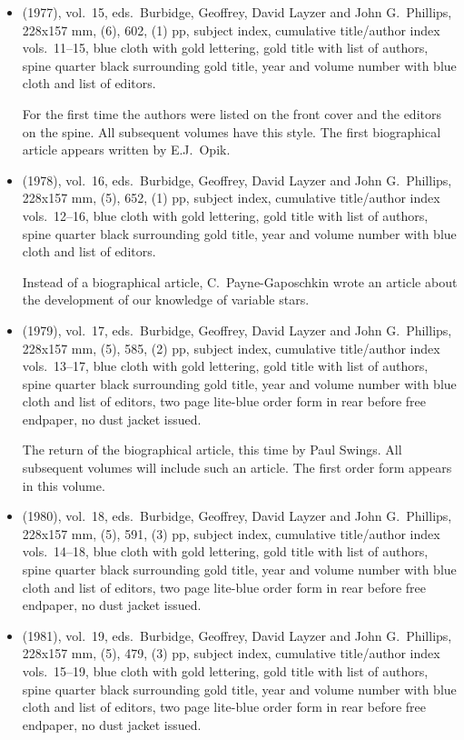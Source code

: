 \begin{itemize}
	\item (1977), vol.\ 15, eds.\ Burbidge, Geoffrey, David Layzer and John G.\ Phillips, 228x157 mm,
	(6), 602, (1) pp, subject index, cumulative title/author index vols.\ 11--15,
	blue cloth with gold lettering, gold title with list of authors,
  spine quarter black surrounding gold title, year and volume number with blue cloth and list of
  editors.
  
  For the first time the authors were listed on the front cover and the editors on the spine.
  All subsequent volumes have this style.  The first biographical article appears written by
  E.J.\ Opik.
	
	\item (1978), vol.\ 16, eds.\ Burbidge, Geoffrey, David Layzer and John G.\ Phillips, 228x157 mm,
	(5), 652, (1) pp, subject index, cumulative title/author index vols.\ 12--16,
	blue cloth with gold lettering, gold title with list of authors,
  spine quarter black surrounding gold title, year and volume number with blue cloth and list of
  editors.
  
  Instead of a biographical article, C.\ Payne-Gaposchkin wrote an article about the development
  of our knowledge of variable stars.
   
	\item (1979), vol.\ 17, eds.\ Burbidge, Geoffrey, David Layzer and John G.\ Phillips, 228x157 mm,
	(5), 585, (2) pp, subject index, cumulative title/author index vols.\ 13--17,
	blue cloth with gold lettering, gold title with list of authors,
  spine quarter black surrounding gold title, year and volume number with blue cloth and list of
  editors, two page lite-blue order form in rear before free endpaper, no dust jacket issued.
  
  The return of the biographical article, this time by Paul Swings.  All subsequent volumes will
  include such an article. The first order form appears in this volume.
  
	\item (1980), vol.\ 18, eds.\ Burbidge, Geoffrey, David Layzer and John G.\ Phillips, 228x157 mm,
	(5), 591, (3) pp, subject index, cumulative title/author index vols.\ 14--18,
	blue cloth with gold lettering, gold title with list of authors,
  spine quarter black surrounding gold title, year and volume number with blue cloth and list of
  editors, two page lite-blue order form in rear before free endpaper, no dust jacket issued.
  
	\item (1981), vol.\ 19, eds.\ Burbidge, Geoffrey, David Layzer and John G.\ Phillips, 228x157 mm,
	(5), 479, (3) pp, subject index, cumulative title/author index vols.\ 15--19,
	blue cloth with gold lettering, gold title with list of authors,
  spine quarter black surrounding gold title, year and volume number with blue cloth and list of
  editors, two page lite-blue order form in rear before free endpaper, no dust jacket issued.
  

\end{itemize}
